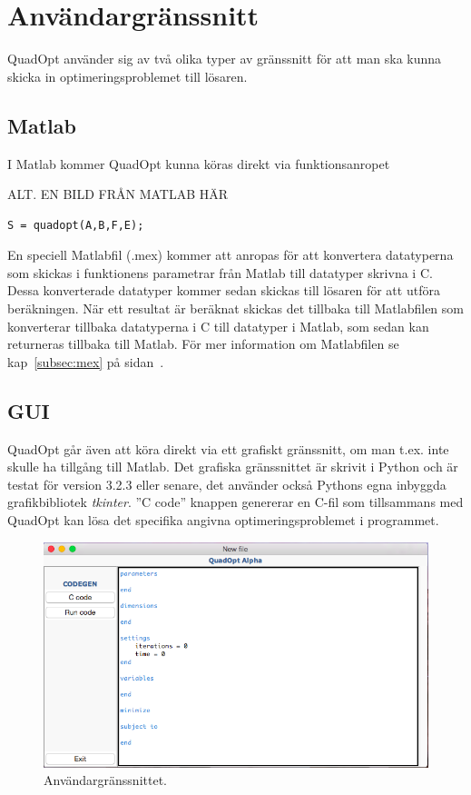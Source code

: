 \section{Användargränssnitt}
QuadOpt använder sig av två olika typer av gränssnitt för att man ska kunna skicka in optimeringsproblemet till lösaren.

\subsection{Matlab}
I Matlab kommer QuadOpt kunna köras direkt via funktionsanropet

ALT. EN BILD FRÅN MATLAB HÄR

\begin{lstlisting}
S = quadopt(A,B,F,E);
\end{lstlisting}
En speciell Matlabfil (.mex) kommer att anropas för att konvertera datatyperna som skickas i funktionens parametrar från Matlab till datatyper skrivna i C. Dessa konverterade datatyper kommer sedan skickas till lösaren för att utföra beräkningen. När ett resultat är beräknat skickas det tillbaka till Matlabfilen som konverterar tillbaka datatyperna i C till datatyper i Matlab, som sedan kan returneras tillbaka till Matlab.
För mer information om Matlabfilen se kap~\ref{subsec:mex} på sidan~\pageref{subsec:mex}.

\subsection{GUI}
QuadOpt går även att köra direkt via ett grafiskt gränssnitt, om man t.ex. inte skulle ha tillgång till Matlab. Det grafiska gränssnittet är skrivit i Python och är testat för version 3.2.3 eller senare, det använder också Pythons egna inbyggda grafikbibliotek \emph{tkinter}. ''C code'' knappen genererar en C-fil som tillsammans med QuadOpt kan lösa det specifika angivna optimeringsproblemet i programmet.

\begin{figure}[h!]
	\begin{center}
		\includegraphics[scale=0.5]{bilder/macgui.png}
	\end{center}
	\caption{Användargränssnittet.}
\end{figure}

